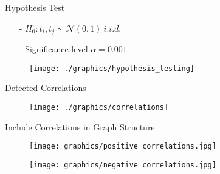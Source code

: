 \documentclass[xcolor=dvipsnames, aspectratio=169]{beamer}
\begin{document}
    
    \begin{frame}{Hypothesis Test}
        
        \begin{minipage}{.35\paperwidth}
            \begin{itemize}
                \item[-] $H_0: t_i, t_j \sim \mathcal{N}(0,1)\ i.i.d.$
                \item[-] Significance level $\alpha = 0.001$
            \end{itemize}
            
        \end{minipage}
        \begin{minipage}{.55\paperwidth}
            \begin{figure}[htbp]
            \centering
            \texttt{[image: ./graphics/hypothesis\_testing]}
        \end{figure}
        \end{minipage}
        
    \end{frame}
    
    \begin{frame}{Detected Correlations}
        \begin{figure}[htbp]
            \centering
            \texttt{[image: ./graphics/correlations]}
        \end{figure}
    \end{frame}
    
    \begin{frame}{Include Correlations in Graph Structure}
    \hspace{.15cm}
    \begin{minipage}{.45\paperwidth}
        \begin{figure}[htbp]
            \texttt{[image: graphics/positive\_correlations.jpg]}
        \end{figure}
    \end{minipage}
    \hspace{.2cm}
    \begin{minipage}{.45\paperwidth}
        \begin{figure}[htbp]
            \texttt{[image: graphics/negative\_correlations.jpg]}
        \end{figure}
    \end{minipage}
    \end{frame}
   
\end{document}
